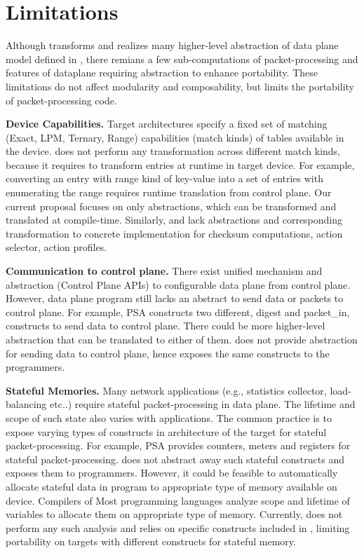 \documentclass[letterpaper,twocolumn,10pt]{article}
\begin{document}
\section{Limitations}
\label{section:limitations}
Although \ucomp transforms and realizes many higher-level abstraction of data plane model defined in \uarch, there remians a few sub-computations of packet-processing and features of dataplane requiring abstraction to enhance portability.
These limitations do not affect modularity and composability, but limits the portability of packet-processing code.

\textbf{Device Capabilities.}
Target architectures specify a fixed set of matching (Exact, LPM, Ternary, Range) capabilities (match kinds) of tables available in the device.
\ucomp does not perform any transformation across different match kinds, because it requires to transform entries at runtime in target device. 
For example, converting an entry with range kind of key-value into a set of entries with enumerating the range requires runtime translation from control plane.
Our current proposal focuses on only abstractions, which can be transformed and translated at compile-time.
Similarly, \uarch and \ucomp lack abstractions and corresponding transformation to concrete implementation for checksum computations, action selector, action profiles.

\textbf{Communication to control plane.}
There exist unified mechanism and abstraction (Control Plane APIs) to configurable data plane from control plane.
However, data plane program still lacks an abstract to send data or packets to control plane.
For example, PSA constructs two different, digest and packet\_in, constructs to send data to control plane.
There could be more higher-level abstraction that can be translated to either of them.
\uarch does not provide abstraction for sending data to control plane, hence exposes the same constructs to the programmers.

\textbf{Stateful Memories.}
Many network applications (e.g., statistics collector, load-balancing etc..) require stateful packet-processing in data plane. 
The lifetime and scope of such state also varies with applications.
The common practice is to expose varying types of constructs in architecture of the target for stateful packet-processing.
For example, PSA provides counters, meters and registers for stateful packet-processing.
\uarch does not abstract away such stateful constructs and exposes them to programmers.
However, it could be feasible to automatically allocate stateful data in program to appropriate type of memory available on device.
Compilers of Most programming languages analyze scope and lifetime of variables to allocate them on appropriate type of memory.
Currently, \ucomp does not perform any such analysis and relies on specific constructs included in \uarch, limiting portability on targets with different constructs for stateful memory.
\end{document}
